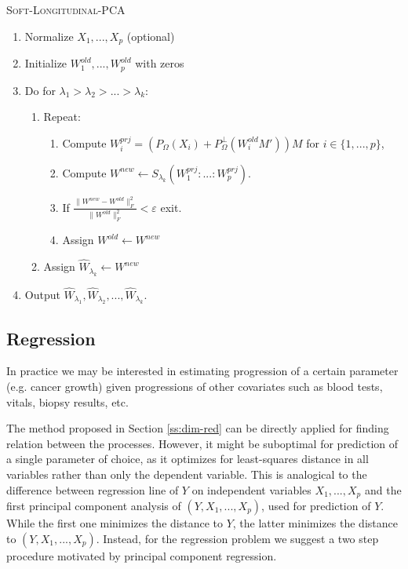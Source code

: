 \documentclass[preprint]{imsart}
\numberwithin{equation}{section}
\theoremstyle{plain}
\begin{document}
\begin{algorithm}
\caption{\textsc{Soft-Longitudinal-PCA}\label{alg:soft-PCA}}
\begin{enumerate}
\item Normalize $X_1,...,X_p$ (optional)
\item Initialize $W^{old}_1,...,W^{old}_p$ with zeros
\item Do for $\lambda_1 > \lambda_2 > ... > \lambda_k$:
\begin{enumerate}
\item Repeat:
\begin{enumerate}
\item Compute $W^{prj}_i = (P_\Omega(X_i) + P_\Omega^\perp(W_i^{old}M'))M$ for $i \in \{1,...,p\}$,
\item Compute $W^{new} \leftarrow S_{\lambda_k}( W^{prj}_1 : ... : W^{prj}_p )$.
\item If $\frac{\|W^{new} - W^{old}\|_F^2}{\|W^{old}\|_F^2} < \varepsilon$ exit.
\item Assign $W^{old} \leftarrow W^{new}$
\end{enumerate}
\item Assign $\hat{W}_{\lambda_k} \leftarrow W^{new}$
\end{enumerate}
\item Output $\hat{W}_{\lambda_1}, \hat{W}_{\lambda_2}, ... , \hat{W}_{\lambda_k}$.
\end{enumerate}
\end{algorithm}

\subsection{Regression}\label{ss:regression}

In practice we may be interested in estimating progression of a certain parameter (e.g. cancer growth) given progressions of other covariates such as blood tests, vitals, biopsy results, etc.

The method proposed in Section \ref{ss:dim-red} can be directly applied for finding relation between the processes. However, it might be suboptimal for prediction of a single parameter of choice, as it optimizes for least-squares distance in all variables rather than only the dependent variable. This is analogical to the difference between regression line of $Y$ on independent variables $X_1,...,X_p$ and the first principal component analysis of $(Y,X_1,...,X_p)$, used for prediction of $Y$. While the first one minimizes the distance to $Y$, the latter minimizes the distance to $(Y,X_1,...,X_p)$. Instead, for the regression problem we suggest a two step procedure motivated by principal component regression. 
\end{document}
